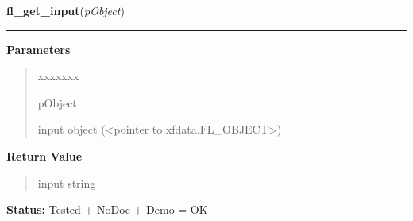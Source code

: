 \hspace{.8\funcindent}\begin{boxedminipage}{\funcwidth}

    \raggedright \textbf{fl\_get\_input}(\textit{pObject})

    \vspace{-1.5ex}

    \rule{\textwidth}{0.5\fboxrule}
\setlength{\parskip}{2ex}
\setlength{\parskip}{1ex}
      \textbf{Parameters}
      \vspace{-1ex}

      \begin{quote}
        \begin{Ventry}{xxxxxxx}

          \item[pObject]

          input object ({\textless}pointer to 
          xfdata.FL\_OBJECT{\textgreater})

        \end{Ventry}

      \end{quote}

      \textbf{Return Value}
    \vspace{-1ex}

      \begin{quote}
      input string

      \end{quote}

\textbf{Status:} Tested + NoDoc + Demo = OK



    \end{boxedminipage}

    \label{xformslib:library:fl_set_input_filter}

    \vspace{0.5ex}

